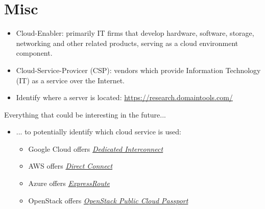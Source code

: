 \documentclass[12pt]{article}
\begin{document}
\section*{Misc}
\begin{itemize}
    \item Cloud-Enabler: primarily IT firms that develop hardware, software, storage, networking and other related products, serving as a cloud environment component.
    \item Cloud-Service-Provicer (CSP): vendors which provide Information Technology (IT) as a service over the Internet.
    \item Identify where a server is located: \url{https://research.domaintools.com/}
\end{itemize}
Everything that could be interesting in the future... 
\begin{itemize}
    \item ... to potentially identify which cloud service is used:
    \begin{itemize}
    \item Google Cloud offers \href{https://cloud.google.com/interconnect/docs/concepts/dedicated-overview}{\textit{Dedicated Interconnect}}
    \item AWS offers \href{https://aws.amazon.com/directconnect/}{\textit{Direct Connect}}
    \item Azure offers \href{https://azure.microsoft.com/en-us/services/expressroute/}{\textit{ExpressRoute}}
    \item OpenStack offers \href{https://www.openstack.org/passport/}{\textit{OpenStack Public Cloud Passport}}
\end{itemize}
\end{itemize}
\end{document}
